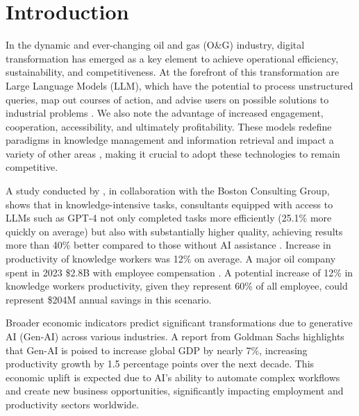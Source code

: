 
\chapter{Introduction}




    In the dynamic and ever-changing oil and gas (O\&G) industry,
    digital transformation has emerged as a key element to achieve operational efficiency, sustainability, and competitiveness. 
    At the forefront of this transformation are Large Language Models (LLM), which have the potential to process unstructured queries, map out courses of action, and advise users on possible solutions to industrial problems \citep{Kar2023}. 
    We also note the advantage of increased engagement, cooperation, accessibility, and ultimately profitability. 
    These models redefine paradigms in knowledge management and information retrieval and impact a variety of other areas \citep{Eckroth2023}, making it crucial to adopt these technologies to remain competitive.    
    
    A study conducted by \citet{Dellacqua2023}, in collaboration with the Boston Consulting Group, shows that in knowledge-intensive tasks, consultants equipped with access to LLMs such as GPT-4 not only completed tasks more efficiently (25.1\% more quickly on average) but also with substantially higher quality, achieving results more than 40\% better compared to those without AI assistance \citep{Dellacqua2023}.
    Increase in productivity of knowledge workers was 12\% on average.    
    A major oil company spent in 2023 \$2.8B with employee compensation \citep{Petrobras2024}.
    A potential increase of 12\% in knowledge workers productivity, given they represent 60\% of all employee, could represent \$204M annual savings in this scenario. 
    
    Broader economic indicators predict significant transformations due to generative AI (Gen-AI) across various industries.
    A report from Goldman Sachs \citep{Hatzius2023} highlights that Gen-AI is poised to increase global GDP by nearly 7\%, increasing productivity growth by 1.5 percentage points over the next decade. 
    This economic uplift is expected due to AI's ability to automate complex workflows and create new business opportunities, significantly impacting employment and productivity sectors worldwide.


